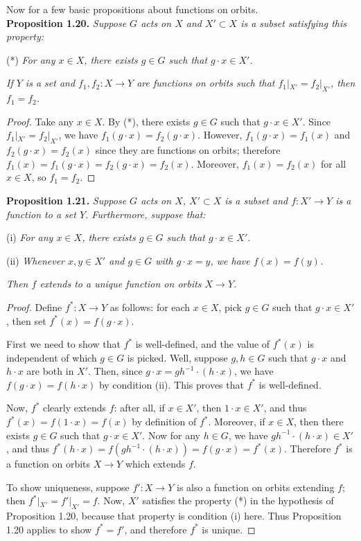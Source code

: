 \documentclass[leqno]{book}
\begin{document}
Now for a few basic propositions about functions on orbits.\\

\noindent\textbf{Proposition 1.20.} \emph{Suppose $G$ acts on $X$ and $X'\subset X$ is a subset satisfying this property:}

(*) \emph{For any $x\in X$, there exists $g\in G$ such that $g\cdot x\in X'$.}

\emph{If $Y$ is a set and $f_1,f_2:X\to Y$ are functions on orbits such that $f_1|_{X'}=f_2|_{X'}$, then $f_1=f_2$.}

\begin{proof}
Take any $x\in X$.  By (*), there exists $g\in G$ such that $g\cdot x\in X'$.  Since $f_1|_{X'}=f_2|_{X'}$, we have $f_1(g\cdot x)=f_2(g\cdot x)$.  However, $f_1(g\cdot x)=f_1(x)$ and $f_2(g\cdot x)=f_2(x)$ since they are functions on orbits; therefore $f_1(x)=f_1(g\cdot x)=f_2(g\cdot x)=f_2(x)$.  Moreover, $f_1(x)=f_2(x)$ for all $x\in X$, so $f_1=f_2$.
\end{proof}

\noindent\textbf{Proposition 1.21.} \emph{Suppose $G$ acts on $X$, $X'\subset X$ is a subset and $f:X'\to Y$ is a function to a set $Y$.  Furthermore, suppose that:}

(i) \emph{For any $x\in X$, there exists $g\in G$ such that $g\cdot x\in X'$.}

(ii) \emph{Whenever $x,y\in X'$ and $g\in G$ with $g\cdot x=y$, we have $f(x)=f(y)$.}

\emph{Then $f$ extends to a unique function on orbits $X\to Y$.}

\begin{proof}
Define $f^*:X\to Y$ as follows: for each $x\in X$, pick $g\in G$ such that $g\cdot x\in X'$, then set $f^*(x)=f(g\cdot x)$.

First we need to show that $f^*$ is well-defined, and the value of $f^*(x)$ is independent of which $g\in G$ is picked.  Well, suppose $g,h\in G$ such that $g\cdot x$ and $h\cdot x$ are both in $X'$.  Then, since $g\cdot x=gh^{-1}\cdot(h\cdot x)$, we have $f(g\cdot x)=f(h\cdot x)$ by condition (ii).  This proves that $f^*$ is well-defined.

Now, $f^*$ clearly extends $f$: after all, if $x\in X'$, then $1\cdot x\in X'$, and thus $f^*(x)=f(1\cdot x)=f(x)$ by definition of $f^*$.  Moreover, if $x\in X$, then there exists $g\in G$ such that $g\cdot x\in X'$.  Now for any $h\in G$, we have $gh^{-1}\cdot(h\cdot x)\in X'$, and thus $f^*(h\cdot x)=f(gh^{-1}\cdot(h\cdot x))=f(g\cdot x)=f^*(x)$.
Therefore $f^*$ is a function on orbits $X\to Y$ which extends $f$.

To show uniqueness, suppose $f':X\to Y$ is also a function on orbits extending $f$; then $f^*|_{X'}=f'|_{X'}=f$.  Now, $X'$ satisfies the property (*) in the hypothesis of Proposition 1.20, because that property is condition (i) here.  Thus Proposition 1.20 applies to show $f^*=f'$, and therefore $f^*$ is unique.
\end{proof}
\end{document}
